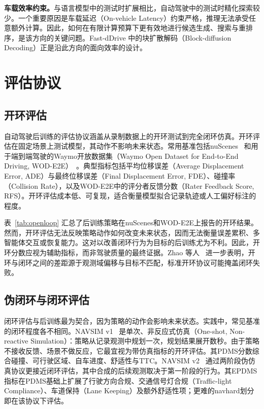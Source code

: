 \documentclass[runningheads]{llncs}
\begin{document}
\textbf{车载效率约束。}与语言模型中的测试时扩展相比，自动驾驶中的测试时精化探索较少。一个重要原因是车载延迟（On-vehicle Latency）约束严格，推理无法承受任意额外计算。因此，如何在有限计算预算下更有效地进行候选生成、搜索与重排序，是该方向的关键问题。Fast-dDrive \cite{fastddrive2026} 中的块扩散解码（Block-diffusion Decoding）正是沿此方向的面向效率的设计。



\section{评估协议}
\label{sec:evaluation}



\subsection{开环评估}
\label{sec:eval:openloop}

自动驾驶后训练的评估协议涵盖从录制数据上的开环测试到完全闭环仿真。开环评估在固定场景上测试模型，其动作不影响未来状态。常用基准包括nuScenes~\cite{nuscenes2020} 和用于端到端驾驶的Waymo开放数据集（Waymo Open Dataset for End-to-End Driving, WOD-E2E）~\cite{wode2e2025}。典型指标包括平均位移误差（Average Displacement Error, ADE）与最终位移误差（Final Displacement Error, FDE）、碰撞率（Collision Rate），以及WOD-E2E中的评分者反馈分数（Rater Feedback Score, RFS）。开环评估成本低、可复现，适合衡量模型拟合记录轨迹或人工偏好标注的程度。

表~\ref{tab:openloop} 汇总了后训练策略在nuScenes和WOD-E2E上报告的开环结果。然而，开环评估无法反映策略动作如何改变未来状态，因而无法衡量误差累积、多智能体交互或恢复能力。这对以改善闭环行为为目标的后训练尤为不利。因此，开环分数应视为辅助指标，而非驾驶质量的最终证据。Zhao 等人~\cite{bridgesim2026} 进一步表明，开环与闭环之间的差距源于观测域偏移与目标不匹配，标准开环协议可能掩盖闭环失败。



\subsection{伪闭环与闭环评估}
\label{sec:eval:closedloop}

闭环评估与后训练最为契合，因为策略的动作会影响未来状态。实践中，常见基准的闭环程度各不相同。NAVSIM v1~\cite{navsim2024} 是单次、非反应式仿真（One-shot, Non-reactive Simulation）：策略从记录观测中规划一次，规划结果展开数秒。由于策略不接收反馈、场景不做反应，它最宜视为带仿真指标的开环评估。其PDMS分数综合碰撞、可行驶区域、自车进度、舒适性与TTC。NAVSIM v2~\cite{navsimv2_2025} 通过两阶段伪仿真协议更接近闭环评估，其中合成的后续观测取决于第一阶段的行为。其EPDMS指标在PDMS基础上扩展了行驶方向合规、交通信号灯合规（Traffic-light Compliance）、车道保持（Lane Keeping）及额外舒适性项；更难的navhard划分即在该协议下评估。
\end{document}
